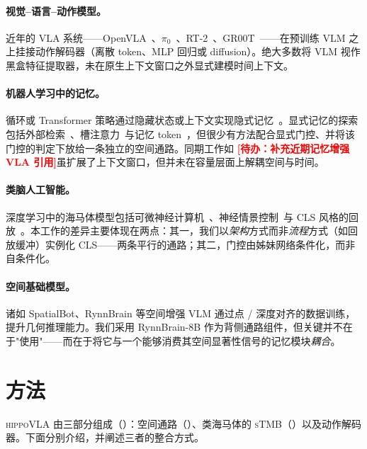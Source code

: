 \documentclass[10pt,letterpaper,fontset=fandol]{ctexart}
\newcommand{\todo}[1]{\textcolor{red}{\textbf{[待办：#1]}}}
\newcommand{\method}{\textsc{hippoVLA}\xspace}
\newcommand{\sTMB}{\textsc{sTMB}\xspace}
\begin{document}
\paragraph{视觉--语言--动作模型。}
近年的 VLA 系统——OpenVLA~\citep{kim2024openvla}、$\pi_0$~\citep{black2024pi0}、RT-2~\citep{brohan2023rt2}、GR00T~\citep{nvidia2025gr00t}——在预训练 VLM 之上挂接动作解码器（离散 token、MLP 回归或 diffusion）。绝大多数将 VLM 视作黑盒特征提取器，未在原生上下文窗口之外显式建模时间上下文。

\paragraph{机器人学习中的记忆。}
循环或 Transformer 策略通过隐藏状态或上下文实现隐式记忆~\citep{brohan2023rt2,reed2022gato}。显式记忆的探索包括外部检索~\citep{wu2022memorizing}、槽注意力~\citep{locatello2020slot}与记忆 token~\citep{bulatov2022rmt}，但很少有方法配合显式门控、并将该门控的判定下放给一条独立的空间通路。同期工作如 \todo{补充近期记忆增强 VLA 引用}虽扩展了上下文窗口，但并未在容量层面上解耦空间与时间。

\paragraph{类脑人工智能。}
深度学习中的海马体模型包括可微神经计算机~\citep{graves2016dnc}、神经情景控制~\citep{pritzel2017nec}与 CLS 风格的回放~\citep{kumaran2016cls,parisi2019cls}。本工作的差异主要体现在两点：其一，我们以\emph{架构}方式而非\emph{流程}方式（如回放缓冲）实例化 CLS——两条平行的通路；其二，门控由姊妹网络条件化，而非自条件化。

\paragraph{空间基础模型。}
诸如 SpatialBot、RynnBrain 等空间增强 VLM 通过点 / 深度对齐的数据训练，提升几何推理能力。我们采用 RynnBrain-8B 作为背侧通路组件，但关键并不在于"使用"——而在于将它与一个能够消费其空间显著性信号的记忆模块\emph{耦合}。

\section{方法}
\label{sec:method}

\method 由三部分组成（）：空间通路（）、类海马体的 \sTMB（）以及动作解码器。下面分别介绍，并阐述三者的整合方式。
\end{document}
